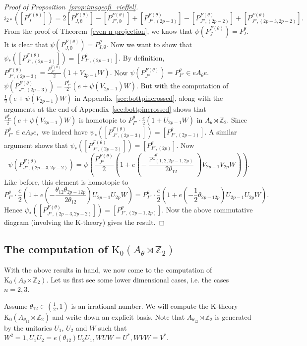 \documentclass[9pt, BCOR=2mm]{amsart}
\numberwithin{equation}{section}
\numberwithin{equation}{section}
\newcommand{\Z}{{\mathbb{Z}}}
\newcommand{\pf}{{\operatorname{pf}}}
\newcommand{\K}{\mathrm{K}} %
\begin{document}
\begin{proof}[Proof of Proposition~\ref{prop:imageofi_rieffel}]
                 
                 $$i_{2*}([P_{J}^{F(\theta)}])=	2[P_{J,\emptyset} ^{F(\theta)}]-[P_{J'',\emptyset} ^{F(\theta)}]+[P_{J'',({2p-3})} ^{F(\theta)}]-[P_{J'', ({2p-2})} ^{F(\theta)}]+[P_{J'', ({2p-3},{2p-2})} ^{F(\theta)}].$$
                From the proof of Theorem~\ref{even n projection}, we know that 
$\psi(P_{J}^{F(\theta)})=P_{I}^{\theta}.$ It is clear that $\psi(P_{J,\emptyset}^{F(\theta)})=P_{I,\emptyset}^{\theta}.$ Now we want to show that $\psi_*([P_{J'',(2p-3)}^{F(\theta)}])=[P_{I'',(2p-1)}^{\theta}].$ By definition, $P_{J'',(2p-3)}^{F(\theta)}=\frac{P_{J''}^{F(\theta)}}{2}(1+V_{2p-1}W).$ Now $\psi(P_{J''}^{F(\theta)})=P_{I''}^{\theta}\in eA_\theta e.$ $\psi(P_{J'',(2p-3)}^{F(\theta)})= \frac{P_{I''}^{\theta}}{2}(e+\psi(V_{2p-1})W).$ But with the computation of $\frac{1}{2}(e+\psi(V_{2p-1})W)$ in Appendix~\ref{sec:bottpincrossed}, along with the arguments at the end of Appendix~\ref{sec:bottpincrossed} shows that $\frac{P_{I''}^{\theta}}{2}(e+\psi(V_{2p-1})W)$ is homotopic to $P_{I''}^{\theta}\cdot\frac{e}{2}(1+U_{2p-1}W)$ in $A_\theta\rtimes \Z_2.$ Since  $P_{I''}^{\theta}\in eA_\theta e,$ we indeed have $\psi_*([P_{J'',(2p-3)}^{F(\theta)}])=[P_{I'',(2p-1)}^{\theta}].$ A similar argument shows that 
$\psi_*([P_{J'',(2p-2)}^{F(\theta)}])=[P_{I'',(2p)}^{\theta}].$ Now 
$$\psi(P_{J'',(2p-3,2p-2)}^{F(\theta)})=\psi\left(\frac{P_{J''}^{F(\theta)}}{2}(1+e(-\frac{{\pf}^{\theta}_{(1,2,2p-1,2p)}}{2\theta_{12}})V_{2p-1}V_{2p}W)\right).$$
Like before, this element is homotopic to 
$$P_{I''}^{\theta}\cdot\frac{e}{2}\left(1+e(-\frac{\theta_{12}\theta_{2p-1 2p}}{2\theta_{12}})U_{2p-1}U_{2p}W\right)=P_{I''}^{\theta}\cdot\frac{e}{2}\left(1+e(-\frac{1}{2}\theta_{2p-1 2p})U_{2p-1}U_{2p}W\right).$$ 
Hence $\psi_*([P_{J'',(2p-3,2p-2)}^{F(\theta)}])=[P_{I'',(2p-1,2p)}^{\theta}].$ Now the above commutative diagram (involving the K-theory) gives the result.
\end{proof}

\subsection*{The computation of $\K_0(A_\theta \rtimes \Z_2)$}
 With the above results in hand, we now come to the computation of $\K_0(A_\theta \rtimes \Z_2).$ Let us first see some lower dimensional cases, i.e. the cases $n=2,3$.
	
	
Assume $\theta_{12} \in (\frac{1}{2},1)$ is an irrational number. 	We will compute the K-theory $\K_0(A_{\theta_{12}}\rtimes \Z_2)$ and write down an explicit basis.  Note that $A_{\theta_{12}}\rtimes\Z_2$ is generated by the unitaries $U_1$, $U_2$ and $W$ such that $W^2 = 1, U_1U_2 = e(\theta_{12})U_2U_1, WUW = U^*, WVW = V^*.$ 
\end{document}
